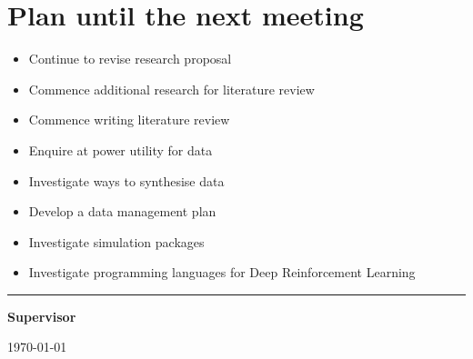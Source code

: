 \documentclass[12pt]{article}
\begin{document}
	\section{Plan until the next meeting}
	\begin{itemize}
		\item Continue to revise research proposal
		
		\item Commence additional research for literature review
		
		\item Commence writing literature review
		
		\item Enquire at power utility for data
		
		\item Investigate ways to synthesise data
		
		\item Develop a data management plan
		
		\item Investigate simulation packages
		
		\item Investigate programming languages for Deep Reinforcement Learning
		
	\end{itemize}
	
	\par
	\vspace{\fill}
	\noindent\rule{0.4\linewidth}{0.5pt}%
	\vspace{1em}%
	\par
	\noindent\textbf{Supervisor}\vspace{1em}%
	\par
	\noindent\today
\end{document}

